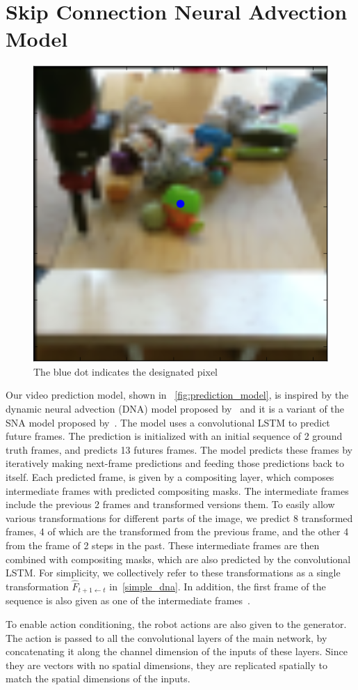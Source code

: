 \newpage

\section{Skip Connection Neural Advection Model}
\label{sec:skipcon}
\begin{figure}
	\centering
	\includegraphics[width=0.37\columnwidth]{images_sna/occlusionaware/img_desigpixb0.png}
	\caption{The blue dot indicates the designated pixel}
	\label{fig:desig_pix_bluedot}
\end{figure}

Our video prediction model, shown in ~\autoref{fig:prediction_model}, is inspired by the dynamic neural advection (DNA) model proposed by~\cite{finn_nips} and it is a variant of the SNA model proposed by~\cite{sna}. The model uses a convolutional LSTM \cite{} to predict future frames. The prediction is initialized with an initial sequence of 2 ground truth frames, and predicts 13 futures frames. The model predicts these frames by iteratively making next-frame predictions and feeding those predictions back to itself. Each predicted frame, is given by a compositing layer, which composes intermediate frames with predicted compositing masks. The intermediate frames include the previous 2 frames and transformed versions them. To easily allow various transformations for different parts of the image, we predict 8 transformed frames, 4 of which are the transformed from the previous frame, and the other 4 from the frame of 2 steps in the past. These intermediate frames are then combined with compositing masks, which are also predicted by the convolutional LSTM. For simplicity, we collectively refer to these transformations as a single transformation $\hat{F}_{t+1 \leftarrow t}$ in~\autoref{simple_dna}. In addition, the first frame of the sequence is also given as one of the intermediate frames~\cite{sna}.

To enable action conditioning, the robot actions are also given to the generator. The action is passed to all the convolutional layers of the main network, by concatenating it along the channel dimension of the inputs of these layers. Since they are vectors with no spatial dimensions, they are replicated spatially to match the spatial dimensions of the inputs.

